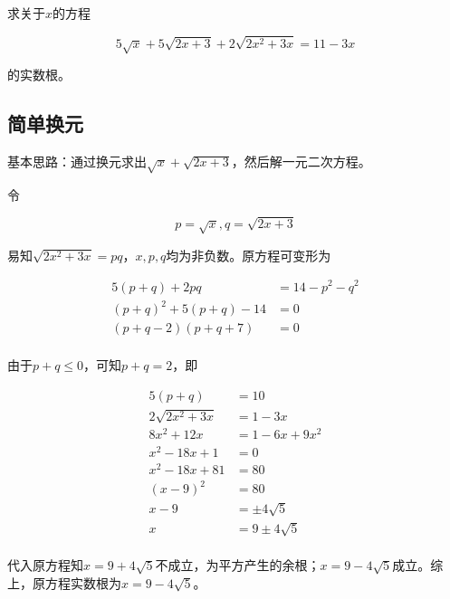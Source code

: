 

求关于$x$的方程

\[ 5\sqrt x + 5\sqrt{2x + 3} + 2\sqrt{2x^2 + 3x} = 11 - 3x \]

的实数根。


\subsection{简单换元}

基本思路：通过换元求出$\sqrt x + \sqrt{2x + 3}$，然后解一元二次方程。

令

\[ p = \sqrt x, q = \sqrt{2x + 3} \]

易知$\sqrt{2x^2 + 3x} = pq$，$x, p, q$均为非负数。原方程可变形为

\begin{align*}
  5(p + q) + 2pq &= 14 - p^2 - q^2 \\
  (p + q)^2 + 5(p + q) - 14 &= 0 \\
  (p + q - 2)(p + q + 7) &= 0 \\
\end{align*}

由于$p + q \le0$，可知$p + q = 2$，即

\begin{align*}
  5(p + q) &= 10 \\
  2\sqrt{2x^2 + 3x} &= 1 - 3x \\
  8x^2 + 12x &= 1 - 6x + 9x^2 \\
  x^2 - 18x + 1 &= 0 \\
  x^2 - 18x + 81 &= 80 \\
  (x - 9)^2 &= 80 \\
  x - 9 &= \pm4\sqrt5 \\
  x &= 9 \pm4\sqrt5 \\
\end{align*}

代入原方程知$x = 9 + 4\sqrt5$不成立，为平方产生的余根；$x = 9 - 4\sqrt5$成立。综上，原方程实数根为$x = 9 - 4\sqrt5$。
